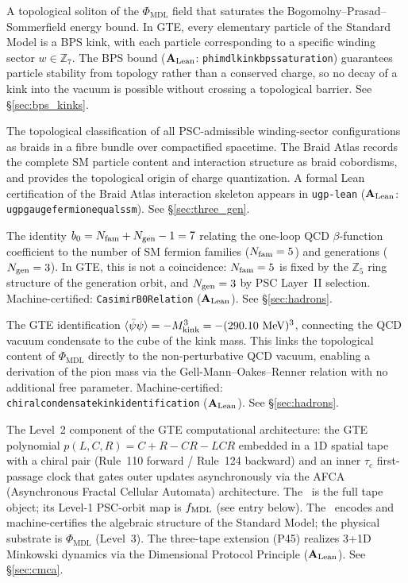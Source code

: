 \documentclass[11pt,openany]{book}
\theoremstyle{remark}
\newcommand{\PHIMDL}{\Phi_{\mathrm{MDL}}}
\newcommand{\lean}[1]{%
  \penalty-100
  \begingroup\def\_{\textunderscore\allowbreak}\texttt{#1}\endgroup}
\newcommand{\CMCA}{\text{CMCA}}
\newcommand{\CatAL}{\ensuremath{\textbf{A}_{\rm Lean}}}
\begin{document}
\begin{appendices}
\begin{description}[leftmargin=*,font=\bfseries,itemsep=6pt]
\item[BPS kink]
A topological soliton of the $\PHIMDL$ field that saturates the
Bogomolny--Prasad--Sommerfield energy bound.
In GTE, every elementary particle of the Standard Model is a BPS kink, with each
particle corresponding to a specific winding sector $w\in\mathbb{Z}_7$.
The BPS bound (\CatAL: \lean{phi\_mdl\_kink\_bps\_saturation}) guarantees particle
stability from topology rather than a conserved charge, so no decay of a kink into
the vacuum is possible without crossing a topological barrier.
See \S\ref{sec:bps_kinks}.

\item[Braid Atlas]
The topological classification of all PSC-admissible winding-sector configurations
as braids in a fibre bundle over compactified spacetime.
The Braid Atlas records the complete SM particle content and interaction structure
as braid cobordisms, and provides the topological origin of charge quantization.
A formal Lean certification of the Braid Atlas interaction skeleton appears in
\texttt{ugp-lean} (\CatAL: \lean{ugp\_gauge\_fermion\_equals\_sm}).
See \S\ref{sec:three_gen}.

\item[Casimir relation]
The identity $b_0 = N_{\rm fam} + N_{\rm gen} - 1 = 7$ relating the one-loop QCD
$\beta$-function coefficient to the number of SM fermion families ($N_{\rm fam}=5$)
and generations ($N_{\rm gen}=3$).
In GTE, this is not a coincidence: $N_{\rm fam}=5$ is fixed by the $\mathbb{Z}_5$
ring structure of the generation orbit, and $N_{\rm gen}=3$ by PSC Layer~II
selection.
Machine-certified: \lean{CasimirB0Relation} (\CatAL).
See \S\ref{sec:hadrons}.

\item[Chiral condensate identification]
The GTE identification $\langle\bar\psi\psi\rangle = -M_{\rm kink}^3 = -(290.10~\text{MeV})^3$,
connecting the QCD vacuum condensate to the cube of the kink mass.
This links the topological content of $\PHIMDL$ directly to the non-perturbative QCD
vacuum, enabling a derivation of the pion mass via the Gell-Mann--Oakes--Renner
relation with no additional free parameter.
Machine-certified: \lean{chiral\_condensate\_kink\_identification} (\CatAL).
See \S\ref{sec:hadrons}.

\item[CMCA --- Chiral Minkowski Cellular Automaton]
The Level~2 component of the GTE computational architecture: the GTE polynomial
$p(L,C,R)=C+R-CR-LCR$ embedded in a 1D spatial tape with a chiral pair
(Rule~110 forward / Rule~124 backward) and an inner $\tau_c$ first-passage clock that
gates outer updates asynchronously via the AFCA (Asynchronous Fractal Cellular
Automata) architecture.
The \CMCA\ is the full tape object; its Level-1 PSC-orbit map is $f_{\rm MDL}$
(see entry below).
The \CMCA\ encodes and machine-certifies the algebraic structure of the Standard Model;
the physical substrate is $\PHIMDL$ (Level~3).
The three-tape extension (P45) realizes 3+1D Minkowski dynamics via the
Dimensional Protocol Principle (\CatAL).
See \S\ref{sec:cmca}.


\end{description}
\end{appendices}
\end{document}
